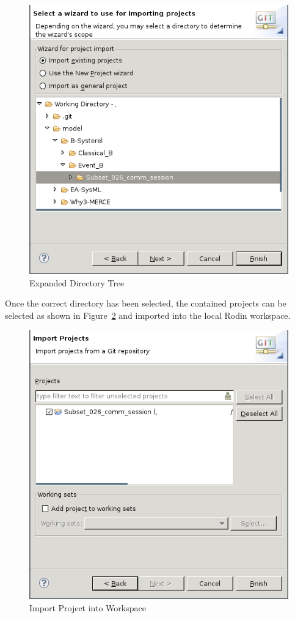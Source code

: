 \documentclass[10pt,a4paper]{article}
\newcommand{\skalierung}{.6}
\begin{document}
\begin{figure}[H]
  \centering
  \includegraphics[width=\skalierung\textwidth]{project_import_step7}
  \caption{Expanded Directory Tree}
  \label{fig:expanded-tree}
\end{figure}

Once the correct directory has been selected, the contained projects can be
selected as shown in Figure~\ref{fig:import-project-workspace} and imported into
the local Rodin workspace.

\begin{figure}[H]
  \centering
  \includegraphics[width=\skalierung\textwidth]{project_import_step8}
  \caption{Import Project into Workspace}
  \label{fig:import-project-workspace}
\end{figure}
\end{document}
